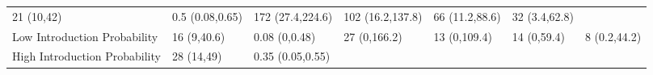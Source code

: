 \documentclass[
]{article}
\begin{document}
\begin{longtable}[]{@{}lllllll@{}}
\begin{minipage}[t]{0.12\columnwidth}
21 (10,42)\strut
\end{minipage} & \begin{minipage}[t]{0.10\columnwidth}\raggedright
0.5 (0.08,0.65)\strut
\end{minipage} & \begin{minipage}[t]{0.11\columnwidth}\raggedright
172 (27.4,224.6)\strut
\end{minipage} & \begin{minipage}[t]{0.11\columnwidth}\raggedright
102 (16.2,137.8)\strut
\end{minipage} & \begin{minipage}[t]{0.09\columnwidth}\raggedright
66 (11.2,88.6)\strut
\end{minipage} & \begin{minipage}[t]{0.10\columnwidth}\raggedright
32 (3.4,62.8)\strut
\end{minipage}\tabularnewline
\begin{minipage}[t]{0.18\columnwidth}\raggedright
Low Introduction Probability\strut
\end{minipage} & \begin{minipage}[t]{0.12\columnwidth}\raggedright
16 (9,40.6)\strut
\end{minipage} & \begin{minipage}[t]{0.10\columnwidth}\raggedright
0.08 (0,0.48)\strut
\end{minipage} & \begin{minipage}[t]{0.11\columnwidth}\raggedright
27 (0,166.2)\strut
\end{minipage} & \begin{minipage}[t]{0.11\columnwidth}\raggedright
13 (0,109.4)\strut
\end{minipage} & \begin{minipage}[t]{0.09\columnwidth}\raggedright
14 (0,59.4)\strut
\end{minipage} & \begin{minipage}[t]{0.10\columnwidth}\raggedright
8 (0.2,44.2)\strut
\end{minipage}\tabularnewline
\begin{minipage}[t]{0.18\columnwidth}\raggedright
High Introduction Probability\strut
\end{minipage} & \begin{minipage}[t]{0.12\columnwidth}\raggedright
28 (14,49)\strut
\end{minipage} & \begin{minipage}[t]{0.10\columnwidth}\raggedright
0.35 (0.05,0.55)\strut
\end{minipage} & \begin{minipage}[t]{0.11\columnwidth}\raggedright

\end{minipage}
\end{longtable}
\end{document}
